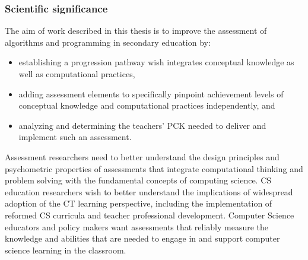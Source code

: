 \subsubsection*{Scientific significance}


The aim of work described in this thesis is to improve the assessment of algorithms and programming in secondary education by:
\begin{itemize}
\item establishing a progression pathway wish integrates conceptual knowledge as well as computational practices,
\item adding assessment elements to specifically pinpoint achievement levels of conceptual knowledge and computational practices independently, and
\item analyzing and determining the teachers' PCK needed to deliver and implement such an assessment.
\end{itemize}


Assessment researchers need to better understand the design principles and psychometric properties of assessments that integrate computational thinking and problem solving with the fundamental concepts of computing science. CS education researchers wish to better understand the implications of widespread adoption of the CT learning perspective, including the implementation of reformed CS curricula and teacher professional development. Computer Science educators and policy makers want assessments that reliably measure the knowledge and abilities that are needed to engage in and support computer science learning in the classroom.


